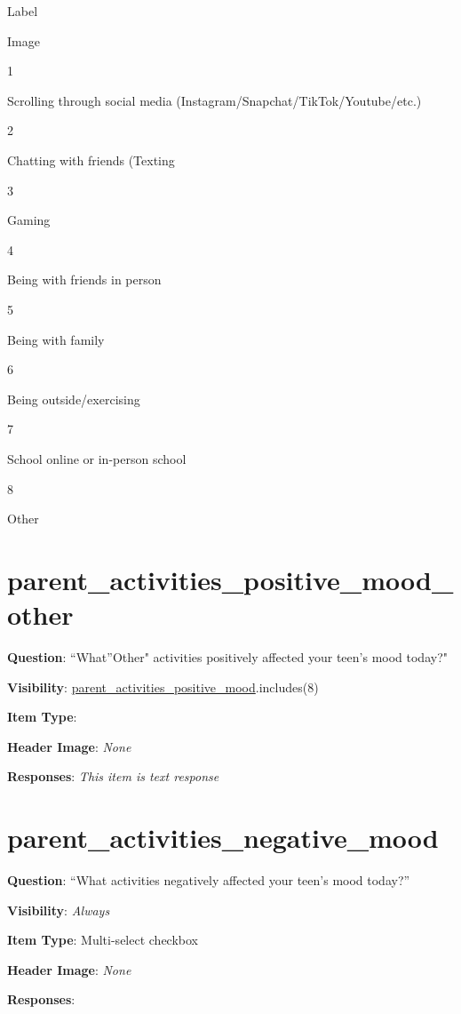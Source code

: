 \documentclass[]{book}
\begin{document}
Label

Image

1

Scrolling through social media (Instagram/Snapchat/TikTok/Youtube/etc.)

2

Chatting with friends (Texting

3

Gaming

4

Being with friends in person

5

Being with family

6

Being outside/exercising

7

School online or in-person school

8

Other

\hypertarget{parent_activities_positive_mood_other}{%
\section{parent\_activities\_positive\_mood\_other}\label{parent_activities_positive_mood_other}}

\textbf{Question}: ``What''Other" activities positively affected your teen's mood today?"

\textbf{Visibility}: \protect\hyperlink{parent_activities_positive_mood}{parent\_activities\_positive\_mood}.includes(8)

\textbf{Item Type}:

\textbf{Header Image}: \emph{None}

\textbf{Responses}: \emph{This item is text response}

\hypertarget{parent_activities_negative_mood}{%
\section{parent\_activities\_negative\_mood}\label{parent_activities_negative_mood}}

\textbf{Question}: ``What activities negatively affected your teen's mood today?''

\textbf{Visibility}: \emph{Always}

\textbf{Item Type}: Multi-select checkbox

\textbf{Header Image}: \emph{None}

\textbf{Responses}:
\end{document}
